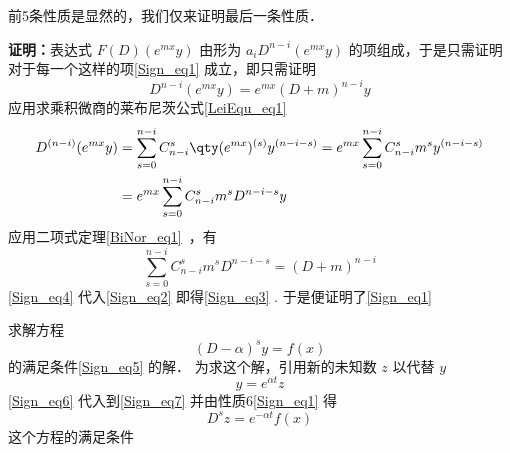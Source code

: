 前5条性质是显然的，我们仅来证明最后一条性质．

\textbf{证明：}表达式 $F(D)(e^{mx}y)$ 由形为 $a_{i}D^{n-i}(e^{mx}y)$ 的项组成，于是只需证明对于每一个这样的项\autoref{Sign_eq1} 成立，即只需证明
\begin{equation}\label{Sign_eq3}
D^{n-i}(e^{mx}y)=e^{mx}(D+m)^{n-i}y
\end{equation}
应用求乘积微商的莱布尼茨公式\autoref{LeiEqu_eq1}~
\begin{equation}\label{Sign_eq2}
\begin{aligned}
D^{(n-i)}(e^{mx}y)&=\sum_{s=0}^{n-i}C_{n-i}^s\qty(e^{mx})^{(s)}y^{(n-i-s)}=e^{mx}\sum_{s=0}^{n-i}C_{n-i}^sm^sy^{(n-i-s)}\\
&=e^{mx}\sum_{s=0}^{n-i}C_{n-i}^sm^sD^{n-i-s}y
\end{aligned}
\end{equation}
应用二项式定理\autoref{BiNor_eq1}~，有
\begin{equation}\label{Sign_eq4}
\sum_{s=0}^{n-i}C_{n-i}^sm^sD^{n-i-s}=(D+m)^{n-i}
\end{equation}
\autoref{Sign_eq4}  代入\autoref{Sign_eq2} 即得\autoref{Sign_eq3} . 于是便证明了\autoref{Sign_eq1} 

\begin{example}{}
求解方程
\begin{equation}\label{Sign_eq7}
(D-\alpha)^sy=f(x)
\end{equation}
的满足条件\autoref{Sign_eq5} 的解．
为求这个解，引用新的未知数 $z$ 以代替 $y$
\begin{equation}\label{Sign_eq6}
y=e^{\alpha t}z
\end{equation}
\autoref{Sign_eq6} 代入到\autoref{Sign_eq7} 并由性质6\autoref{Sign_eq1} 得
\begin{equation}
D^sz=e^{-\alpha t}f(x)
\end{equation}
这个方程的满足条件
\begin{equation}

\end{equation}

\end{example}

